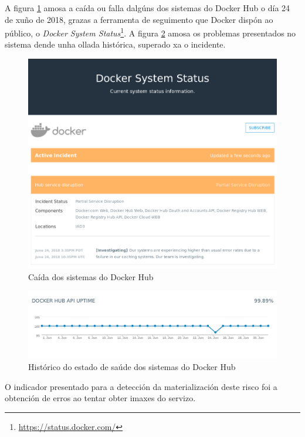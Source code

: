 A figura \ref{caidaAgora} amosa a caída ou falla dalgúns dos sistemas do Docker Hub o día 24 de xuño de 2018, grazas a ferramenta de seguimento que Docker dispón ao público, o \textit{Docker System Status}\footnote{\url{https://status.docker.com/}}. A figura \ref{caidaPasada} amosa os problemas presentados no sistema dende unha ollada histórica, superado xa o incidente.\\

\begin{figure}
\centerline{\includegraphics[width=15cm]{figuras/caidaAgora.png}}
\caption{Caída dos sistemas do Docker Hub}
\label{caidaAgora}
\end{figure}

\begin{figure}
\centerline{\includegraphics[width=15cm]{figuras/caidaPasada.png}}
\caption{Histórico do estado de saúde dos sistemas do Docker Hub}
\label{caidaPasada}
\end{figure}

O indicador presentado para a detección da materialización deste risco foi a obtención de erros ao tentar obter imaxes do servizo.

